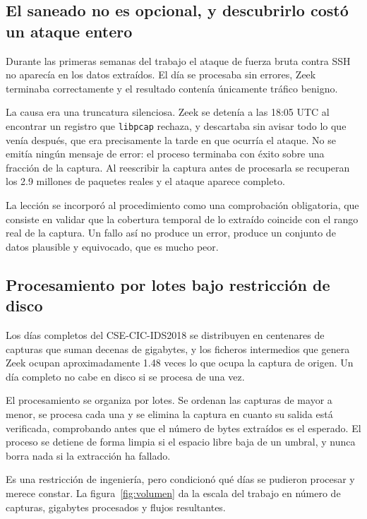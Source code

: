 \subsection*{El saneado no es opcional, y descubrirlo costó un ataque entero}

Durante las primeras semanas del trabajo el ataque de fuerza bruta contra SSH no
aparecía en los datos extraídos. El día se procesaba sin errores, Zeek terminaba
correctamente y el resultado contenía únicamente tráfico benigno.

La causa era una truncatura silenciosa. Zeek se detenía a las 18:05 UTC al
encontrar un registro que \texttt{libpcap} rechaza, y descartaba sin avisar todo
lo que venía después, que era precisamente la tarde en que ocurría el ataque. No
se emitía ningún mensaje de error: el proceso terminaba con éxito sobre una
fracción de la captura. Al reescribir la captura antes de procesarla se recuperan
los 2.9 millones de paquetes reales y el ataque aparece completo.

La lección se incorporó al procedimiento como una comprobación obligatoria, que
consiste en validar que la cobertura temporal de lo extraído coincide con el
rango real de la captura. Un fallo así no produce un error, produce un conjunto
de datos plausible y equivocado, que es mucho peor.

\subsection*{Procesamiento por lotes bajo restricción de disco}

Los días completos del CSE-CIC-IDS2018 se distribuyen en centenares de capturas
que suman decenas de gigabytes, y los ficheros intermedios que genera Zeek ocupan
aproximadamente 1.48 veces lo que ocupa la captura de origen. Un día completo no
cabe en disco si se procesa de una vez.

El procesamiento se organiza por lotes. Se ordenan las capturas de mayor a menor,
se procesa cada una y se elimina la captura en cuanto su salida está verificada,
comprobando antes que el número de bytes extraídos es el esperado. El proceso se
detiene de forma limpia si el espacio libre baja de un umbral, y nunca borra nada
si la extracción ha fallado.

Es una restricción de ingeniería, pero condicionó qué días se pudieron procesar y
merece constar. La figura~\ref{fig:volumen} da la escala del trabajo en número de
capturas, gigabytes procesados y flujos resultantes.

